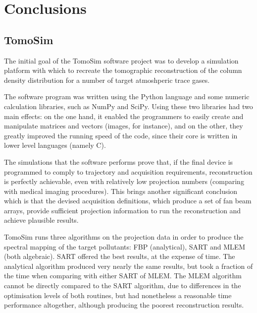 \chapter{Conclusions}
\label{cha:conclusions}

\section{TomoSim}%
\label{sec:tomosim_conclusions}

The initial goal of the TomoSim software project was to develop a
simulation platform with which to recreate the tomographic
reconstruction of the column density distribution for a number of target
atmoshperic trace gases.

The software program was written using the Python language and some
numeric calculation libraries, such as NumPy and SciPy. Using these two
libraries had two main effects: on the one hand, it enabled the
programmers to easily create and manipulate matrices and vectors
(images, for instance), and on the other, they greatly improved the
running speed of the code, since their core is written in lower level
languages (namely C).

The simulations that the software performs prove that, if the final
device is programmed to comply to trajectory and acquisition
requirements, reconstruction is perfectly achievable, even with
relatively low projection numbers (comparing with medical imaging
procedures). This brings another significant conclusion which is that
the devised acquisition definitions, which produce a set of fan beam
arrays, provide sufficient projection information to run the
reconstruction and achieve plausible results.

TomoSim runs three algorithms on the projection data in order to produce
the spectral mapping of the target pollutants: FBP (analytical), SART and
MLEM (both algebraic). SART offered the best results, at the expense of
time. The analytical algorithm produced very nearly the same results,
but took a fraction of the time when comparing with either SART of MLEM.
The MLEM algorithm cannot be directly compared to the SART algorithm,
due to differences in the optimisation levels of both routines, but had
nonetheless a reasonable time performance altogether, although producing
the poorest reconstruction results.

